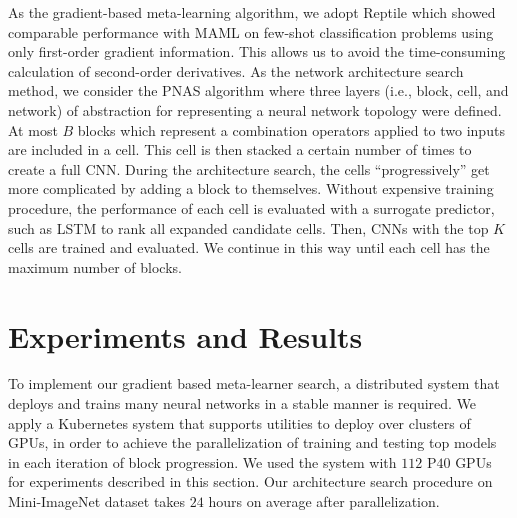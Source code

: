 \documentclass{article}
\begin{document}
As the gradient-based meta-learning algorithm, we adopt Reptile \cite{nichol:reptile:DBLP:journals/corr/abs-1803-02999} which showed comparable performance with MAML \cite{finn:maml:DBLP:conf/icml/FinnAL17} on few-shot classification problems using only first-order gradient information. This allows us to avoid the time-consuming calculation of second-order derivatives.
As the network architecture search method, we consider the PNAS algorithm \cite{liu:pnas_google:DBLP:journals/corr/abs-1712-00559} where three layers (i.e., block, cell, and network) of abstraction for representing a neural network topology were defined. At most $B$ blocks which represent a combination operators applied to two inputs are included in a cell. This cell is then stacked a certain number of times to create a full CNN. During the architecture search, the cells ``progressively'' get more complicated by adding a block to themselves. Without expensive training procedure, the performance of each cell is evaluated with a surrogate predictor, such as LSTM to rank all expanded candidate cells. Then, CNNs with the top $K$ cells are trained and evaluated. We continue in this way until each cell has the maximum number of blocks.

\section{Experiments and Results}
To implement our gradient based meta-learner search, 
a distributed system that deploys and trains many neural networks
in a stable manner is required. We apply a Kubernetes system \cite{Kubernetes} that supports utilities to deploy over clusters of GPUs, in order to achieve the parallelization of training and testing top models in each iteration of block progression. 
We used the system with $112$ P$40$ GPUs for experiments described in this section. 
Our architecture search procedure on Mini-ImageNet dataset takes $24$ hours on average after parallelization.
\end{document}

